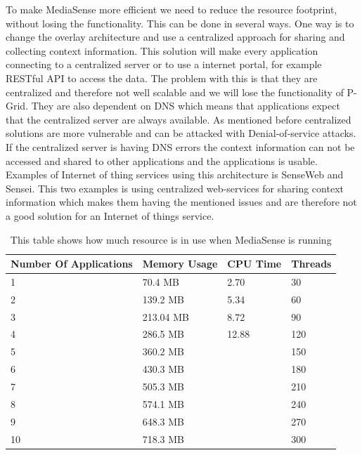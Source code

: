 To make MediaSense more efficient we need to reduce the resource footprint, without losing  the functionality. This can be done in several ways. One way is to change the overlay architecture and use a centralized approach for sharing and collecting context information. This solution will make every application connecting to a centralized server or to use a internet portal, for example RESTful API to access the data. The problem with this is that they are centralized and therefore not well scalable and we will lose the functionality of P-Grid. They are also dependent on DNS which means that applications expect that the centralized server are always available. As mentioned before centralized solutions are more vulnerable and can be attacked with Denial-of-service attacks. If the centralized server is having DNS errors the context information can not be accessed and shared to other applications and the applications is usable. Examples of Internet of thing services using this architecture is SenseWeb and Sensei. This two examples is using centralized web-services for sharing context information which makes them having the mentioned issues and are therefore not a good solution for an Internet of things service.

\begin{center}
\begin{table}
    \begin{tabularx}{\textwidth}{ |X|X|X|X| }
    \hline
    Number Of Applications 								& Memory Usage 									& CPU Time							& Threads\\ \hline
    1 													& 70.4 MB 										& 2.70 								& 30 \\ \hline
    2 													& 139.2 MB										& 5.34 								& 60 \\ \hline
    3 													& 213.04 MB										& 8.72 								& 90 \\ \hline
    4 													& 286.5 MB										& 12.88 							& 120 \\ \hline
    5													& 360.2 MB										&   								& 150 \\ \hline
    6													& 430.3 MB										&   								& 180 \\ \hline	
    7													& 505.3 MB										&   								& 210 \\ \hline
    8													& 574.1 MB										&   								& 240 \\ \hline
    9													& 648.3 MB										&   								& 270 \\ \hline
    10													& 718.3 MB										&   								& 300 \\ \hline
    \end{tabularx}
   	\caption{This table shows how much resource is in use when MediaSense is running}
	\label{tab:test_table}
\end{table}
\end{center}